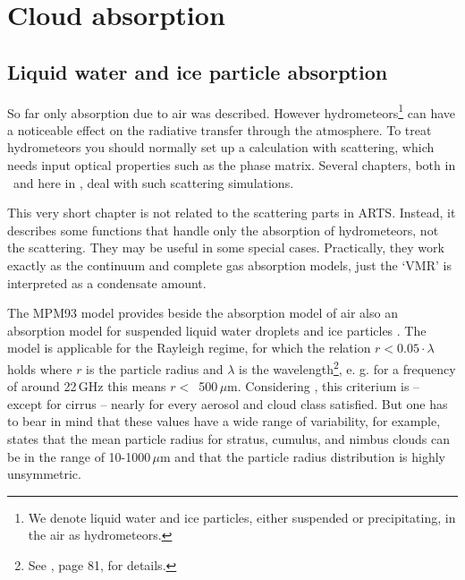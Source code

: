 
\chapter{Cloud absorption}
\label{sec:abs_theory:cloudabsorption}

\section{Liquid water and ice particle absorption}
\label{sec:abs_theory:lipartabs}

So far only absorption due to air was described. However 
hydrometeors\footnote{We denote liquid water and ice particles, either
  suspended or precipitating, in the air as hydrometeors.}
can have a noticeable effect on the radiative transfer through the
atmosphere.
To treat hydrometeors you should normally set up a calculation with
scattering, which needs input optical properties such as the phase
matrix. Several chapters, both in \user\ and here in \theory, deal
with such scattering simulations.

This very short chapter is not related to the scattering parts in
ARTS. Instead, it describes some functions that handle only the
absorption of hydrometeors, not the scattering. They may be useful in
some special cases. Practically, they work exactly as the continuum
and complete gas absorption models, just the `VMR' is interpreted as a
condensate amount.

The MPM93 model provides beside the absorption model of air also an
absorption model for suspended liquid water droplets and ice particles
\citep{liebe:89b,liebeetal:91,hufford:91,liebeetal:93}.  The model is
applicable for the Rayleigh regime, for which the relation $r <
0.05\cdot \lambda$ holds where $r$ is the particle radius and
$\lambda$ is the wavelength\footnote{See \citet{brussaard:95}, page
  81, for details.}, e. g. for a frequency of around 22\,GHz 
this means $r<$~500\,$\mu$m. Considering \citet{salby:96}, this criterium is --
except for cirrus -- nearly for every aerosol and cloud class
satisfied. But one has to bear in mind that these values have a wide
range of variability, for example, \citet{salby:96} states that the
mean particle radius for stratus, cumulus, and nimbus clouds can be in
the range of 10-1000\,$\mu$m and that the particle radius distribution
is highly unsymmetric. 

